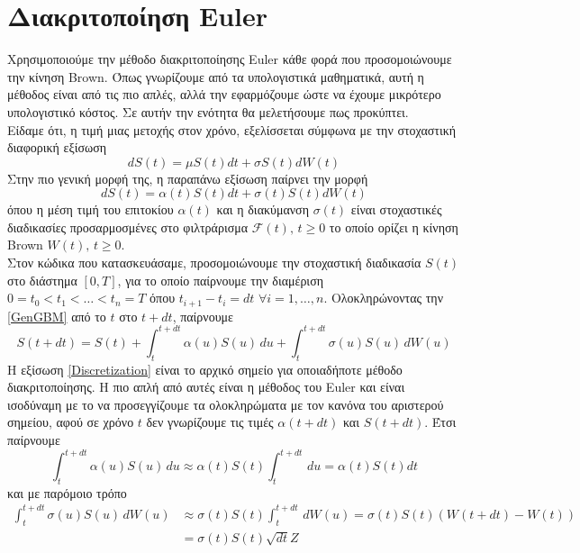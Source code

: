 \documentclass[12pt,a4paper,twoside,openany]{book}
\begin{document}
\section{Διακριτοποίηση Euler}
\vspace{2.5mm}
 	Χρησιμοποιούμε την μέθοδο διακριτοποίησης Euler κάθε φορά που προσομοιώνουμε την κίνηση Brown. Όπως γνωρίζουμε από τα υπολογιστικά μαθηματικά, αυτή η μέθοδος είναι από τις πιο απλές, αλλά την εφαρμόζουμε ώστε να έχουμε μικρότερο υπολογιστικό κόστος.  Σε αυτήν την ενότητα θα μελετήσουμε πως προκύπτει.
 	\vspace{2.5mm}\\
 	Είδαμε ότι, η τιμή μιας μετοχής στον χρόνο, εξελίσσεται σύμφωνα με την στοχαστική διαφορική εξίσωση
 	\[dS(t)= \mu S(t)dt + \sigma S(t)dW(t) \]
 	Στην πιο γενική μορφή της, η παραπάνω εξίσωση παίρνει την μορφή
 	\[dS(t)= \alpha(t) S(t)dt + \sigma(t) S(t)dW(t) \label{GenGBM}\tag{4.1.1}\]
 	όπου η μέση τιμή του επιτοκίου $\alpha(t)$ και η διακύμανση $\sigma(t)$ είναι στοχαστικές διαδικασίες προσαρμοσμένες στο φιλτράρισμα $\mathcal{F}(t),\, t\geq0$ το οποίο ορίζει η κίνηση Brown $W(t),\, t\geq0$.
 	\vspace{2.5mm}\\
 	Στον κώδικα που κατασκευάσαμε, προσομοιώνουμε την στοχαστική διαδικασία $S(t)$ στο διάστημα $[0,T]$, για το οποίο παίρνουμε την διαμέριση $0=t_0<t_1<\dots<t_n=T$ όπου $t_{i+1}-t_i=dt \,\,\forall i=1,\dots,n$. Ολοκληρώνοντας την \eqref{GenGBM} από το $t$ στο $t+dt$, παίρνουμε
 	\[S(t+dt)= S(t) + \int_{t}^{t+dt}\alpha(u) S(u)\, du + \int_{t}^{t+dt}\sigma(u) S(u)\, dW(u) \label{Discretization}\tag{4.1.2}\]
 	Η εξίσωση \eqref{Discretization} είναι το αρχικό σημείο για οποιαδήποτε μέθοδο διακριτοποίησης. Η πιο απλή από αυτές είναι η μέθοδος του Euler και είναι ισοδύναμη με το να προσεγγίζουμε τα ολοκληρώματα με τον κανόνα του αριστερού σημείου, αφού σε χρόνο $t$ δεν γνωρίζουμε τις τιμές $\alpha(t+dt)$ και $S(t+dt)$. Έτσι παίρνουμε
 	\[\int_{t}^{t+dt}\alpha(u) S(u)\, du \approx \alpha(t) S(t)\int_{t}^{t+dt}\, du = \alpha(t) S(t)dt  \]
 	και με παρόμοιο τρόπο
 	\begin{align*}
 		\int_{t}^{t+dt}\sigma(u) S(u)\, dW(u) &\approx \sigma(t) S(t)\int_{t}^{t+dt}\, dW(u) = \sigma(t) S(t)\left(W(t+dt)-W(t)\right) \\
 											  &= \sigma(t) S(t)\sqrt{dt}Z
 	\end{align*}
\end{document}
